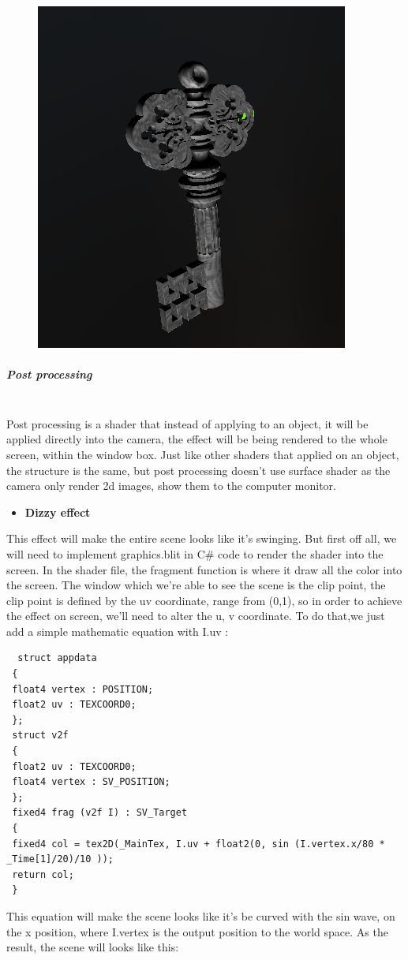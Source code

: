 \documentclass[a4paper, 13pt]{extarticle}
\begin{document}
{\begin{figure}[h]
			\begin{minipage}{1\textwidth}
				\centering
				\includegraphics[width=0.3\linewidth]{intructions/light_react.png}
				\centering
			\end{minipage}
	\end{figure}
\subparagraph{Post processing} ~\\
Post processing is a shader that instead of applying to an object, it will be applied directly into the camera, the effect will be being rendered to the whole screen, within the window box. Just like other shaders that applied on an object, the structure is the same, but post processing doesn't use surface shader as the camera only render 2d images, show them to the computer monitor.
\begin{itemize}
	\item \bfseries Dizzy effect 
\end{itemize} 
 This effect will make the entire scene looks like it's swinging. But first off all, we will need to implement graphics.blit in C\# code to render the shader into the screen. In the shader file, the fragment function is where it draw all the color into the screen. The window which we're able to see the scene is the clip point, the clip point is defined by the uv coordinate, range from (0,1), so in order to achieve the effect on screen, we'll need to alter the u, v coordinate. To do that,we just add a simple mathematic equation with I.uv : 
 \begin{lstlisting}
  struct appdata
 {
 float4 vertex : POSITION;
 float2 uv : TEXCOORD0;
 };
 struct v2f
 {
 float2 uv : TEXCOORD0;
 float4 vertex : SV_POSITION;
 };
 fixed4 frag (v2f I) : SV_Target
 {
 fixed4 col = tex2D(_MainTex, I.uv + float2(0, sin (I.vertex.x/80 * _Time[1]/20)/10 ));
 return col;
 }
 \end{lstlisting} 
 This equation will make the scene looks like it's be curved with the sin wave, on the x position, where I.vertex is the output position to the world space. As the result, the scene will looks like this: 
 \newpage
 ~
 \begin{figure}[h] 

\end{figure}}
\end{document}
